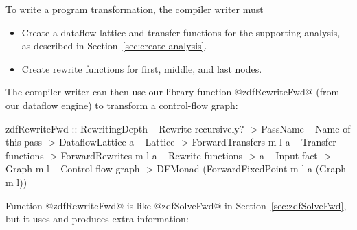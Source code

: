 \documentclass[blockstyle,preprint,natbib,nocopyrightspace]{sigplanconf}
\newcommand\secref[1]{Section~\ref{sec:#1}}
\newcommand\seclabel[1]{\label{sec:#1}}
\begin{document}
To write a program transformation,
the compiler writer must 
\begin{itemize}
\item
Create a dataflow lattice and transfer functions for the supporting
analysis, as described in \secref{create-analysis}. 
\item
Create rewrite functions for first, middle, and last nodes.
\end{itemize}
The
compiler writer can then use our
library function @zdfRewriteFwd@ (from our dataflow engine) to
transform a control-flow 
graph:
\begin{code}
  zdfRewriteFwd 
    :: RewritingDepth         -- Rewrite recursively?
    -> PassName               -- Name of this pass
    -> DataflowLattice a      -- Lattice
    -> ForwardTransfers m l a -- Transfer functions
    -> ForwardRewrites m l a  -- Rewrite functions
    -> a                      -- Input fact
    -> Graph m l              -- Control-flow graph
    -> DFMonad (ForwardFixedPoint m l a (Graph m l))
\end{code}
Function @zdfRewriteFwd@ is like @zdfSolveFwd@ in
\secref{zdfSolveFwd}, but it uses and produces extra
information:\seclabel{engine-truth} 
\end{document}
